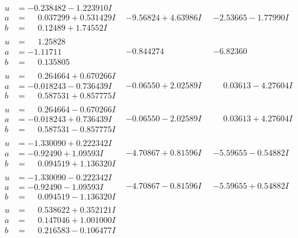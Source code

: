 \documentclass[1p]{elsarticle_modified}
\theoremstyle{definition}
\begin{document}
$$\begin{array}{c|c|c}
\begin{aligned}
u &= -0.238482 - 1.223910 I \\
a &= \phantom{-}0.037299 + 0.531429 I \\
b &= \phantom{-}0.12489 + 1.74552 I\end{aligned}
 & -9.56824 + 4.63986 I & -2.53665 - 1.77990 I \\ \hline\begin{aligned}
u &= \phantom{-}1.25828\phantom{ +0.000000I} \\
a &= -1.11711\phantom{ +0.000000I} \\
b &= \phantom{-}0.135805\phantom{ +0.000000I}\end{aligned}
 & -0.844274\phantom{ +0.000000I} & -6.82360\phantom{ +0.000000I} \\ \hline\begin{aligned}
u &= \phantom{-}0.264664 + 0.670266 I \\
a &= -0.018243 - 0.736439 I \\
b &= \phantom{-}0.587531 + 0.857775 I\end{aligned}
 & -0.06550 + 2.02589 I & \phantom{-}0.03613 - 4.27604 I \\ \hline\begin{aligned}
u &= \phantom{-}0.264664 - 0.670266 I \\
a &= -0.018243 + 0.736439 I \\
b &= \phantom{-}0.587531 - 0.857775 I\end{aligned}
 & -0.06550 - 2.02589 I & \phantom{-}0.03613 + 4.27604 I \\ \hline\begin{aligned}
u &= -1.330090 + 0.222342 I \\
a &= -0.92490 + 1.09593 I \\
b &= \phantom{-}0.094519 + 1.136320 I\end{aligned}
 & -4.70867 + 0.81596 I & -5.59655 - 0.54882 I \\ \hline\begin{aligned}
u &= -1.330090 - 0.222342 I \\
a &= -0.92490 - 1.09593 I \\
b &= \phantom{-}0.094519 - 1.136320 I\end{aligned}
 & -4.70867 - 0.81596 I & -5.59655 + 0.54882 I \\ \hline\begin{aligned}
u &= \phantom{-}0.538622 + 0.352121 I \\
a &= \phantom{-}0.147046 + 1.001000 I \\
b &= \phantom{-}0.216583 - 0.106477 I\end{aligned}

\end{array}$$
\end{document}
